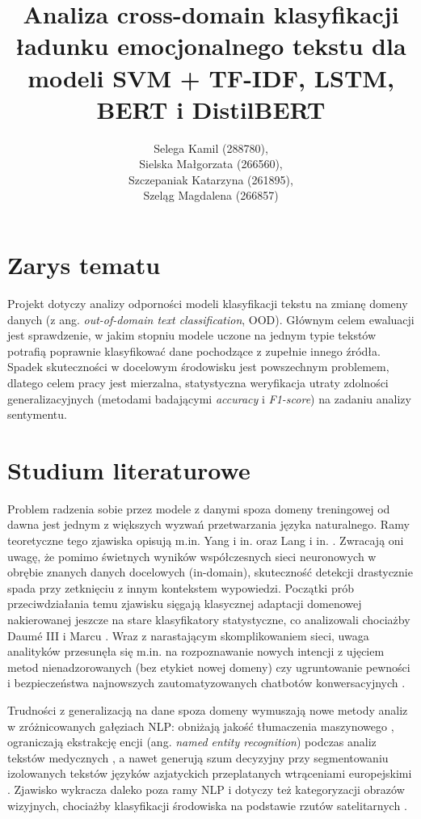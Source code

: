 \documentclass[runningheads]{llncs}
\title{Analiza cross-domain klasyfikacji ładunku emocjonalnego tekstu dla modeli SVM + TF-IDF, LSTM, BERT i DistilBERT}
\author{Selega Kamil (288780),\\ Sielska Małgorzata (266560),\\ Szczepaniak Katarzyna (261895),\\ Szeląg Magdalena (266857)}
\institute{
Politechnika Wrocławska\\
 Wydział Informatyki i Telekomunikacji (W4N)\\
 Kierunek: Zaufane Systemy Sztucznej Inteligencji (TAI) \\
 Kurs: Przetwarzanie Języka Naturalnego
}
\date{}
\begin{document}
\maketitle

\section*{Zarys tematu}
Projekt dotyczy analizy odporności modeli klasyfikacji tekstu na zmianę domeny danych (z ang. \textit{out-of-domain text classification}, OOD). Głównym celem ewaluacji jest sprawdzenie, w jakim stopniu modele uczone na jednym typie tekstów potrafią poprawnie klasyfikować dane pochodzące z zupełnie innego źródła. Spadek skuteczności w docelowym środowisku jest powszechnym problemem, dlatego celem pracy jest mierzalna, statystyczna weryfikacja utraty zdolności generalizacyjnych (metodami badającymi \textit{accuracy} i \textit{F1-score}) na zadaniu analizy sentymentu.

\section*{Studium literaturowe}
Problem radzenia sobie przez modele z danymi spoza domeny treningowej od dawna jest jednym z większych wyzwań przetwarzania języka naturalnego. Ramy teoretyczne tego zjawiska opisują m.in. Yang i in. \cite{yang2023outofdistributiongeneralizationtextclassification} oraz Lang i in. \cite{lang2023surveyoutofdistributiondetectionnlp}. Zwracają oni uwagę, że pomimo świetnych wyników współczesnych sieci neuronowych w obrębie znanych danych docelowych (in-domain), skuteczność detekcji drastycznie spada przy zetknięciu z innym kontekstem wypowiedzi. Początki prób przeciwdziałania temu zjawisku sięgają klasycznej adaptacji domenowej nakierowanej jeszcze na stare klasyfikatory statystyczne, co analizowali chociażby Daumé III i Marcu \cite{DBLP:journals/corr/abs-1109-6341}. Wraz z narastającym skomplikowaniem sieci, uwaga analityków przesunęła się m.in. na rozpoznawanie nowych intencji z ujęciem metod nienadzorowanych (bez etykiet nowej domeny) \cite{9741317} czy ugruntowanie pewności i bezpieczeństwa najnowszych zautomatyzowanych chatbotów konwersacyjnych \cite{9052492}.

Trudności z generalizacją na dane spoza domeny wymuszają nowe metody analiz w zróżnicowanych gałęziach NLP: obniżają jakość tłumaczenia maszynowego \cite{haddow-koehn-2012-analysing}, ograniczają ekstrakcję encji (ang. \textit{named entity recognition}) podczas analiz tekstów medycznych \cite{9648338}, a nawet generują szum decyzyjny przy segmentowaniu izolowanych tekstów języków azjatyckich przeplatanych wtrąceniami europejskimi \cite{Limkonchotiwat2021HandlingCA}. Zjawisko wykracza daleko poza ramy NLP i dotyczy też kategoryzacji obrazów wizyjnych, chociażby klasyfikacji środowiska na podstawie rzutów satelitarnych \cite{Kolodner2022EvaluatingDL}.
\end{document}
